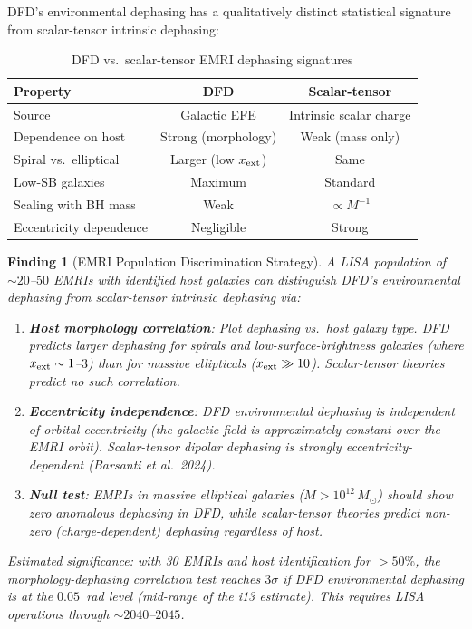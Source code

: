 \documentclass[11pt]{article}
\newtheorem{finding}{Finding}
\begin{document}
DFD's environmental dephasing has a qualitatively distinct statistical
signature from scalar-tensor intrinsic dephasing:

\begin{table}[H]
\centering
\caption{DFD vs.\ scalar-tensor EMRI dephasing signatures}
\begin{tabular}{lcc}
\toprule
Property & DFD & Scalar-tensor \\
\midrule
Source & Galactic EFE & Intrinsic scalar charge \\
Dependence on host & Strong (morphology) & Weak (mass only) \\
Spiral vs.\ elliptical & Larger (low $x_{\rm ext}$) & Same \\
Low-SB galaxies & Maximum & Standard \\
Scaling with BH mass & Weak & $\propto M^{-1}$ \\
Eccentricity dependence & Negligible & Strong \\
\bottomrule
\end{tabular}
\end{table}

\begin{finding}[EMRI Population Discrimination Strategy]
\label{find:EMRI-pop}
A LISA population of $\sim 20$--$50$ EMRIs with identified host
galaxies can distinguish DFD's environmental dephasing from
scalar-tensor intrinsic dephasing via:
\begin{enumerate}[nosep]
\item \textbf{Host morphology correlation}: Plot dephasing vs.\ host
  galaxy type. DFD predicts larger dephasing for spirals and
  low-surface-brightness galaxies (where $x_{\rm ext} \sim 1$--$3$)
  than for massive ellipticals ($x_{\rm ext} \gg 10$). Scalar-tensor
  theories predict no such correlation.
\item \textbf{Eccentricity independence}: DFD environmental dephasing
  is independent of orbital eccentricity (the galactic field is
  approximately constant over the EMRI orbit). Scalar-tensor dipolar
  dephasing is strongly eccentricity-dependent (Barsanti et al.\ 2024).
\item \textbf{Null test}: EMRIs in massive elliptical galaxies
  ($M > 10^{12}\,M_\odot$) should show \emph{zero} anomalous
  dephasing in DFD, while scalar-tensor theories predict non-zero
  (charge-dependent) dephasing regardless of host.
\end{enumerate}

Estimated significance: with 30 EMRIs and host identification for
$> 50\%$, the morphology-dephasing correlation test reaches $3\sigma$
if DFD environmental dephasing is at the $0.05$~rad level (mid-range
of the i13 estimate). This requires LISA operations through
$\sim 2040$--$2045$.
\end{finding}
\end{document}
